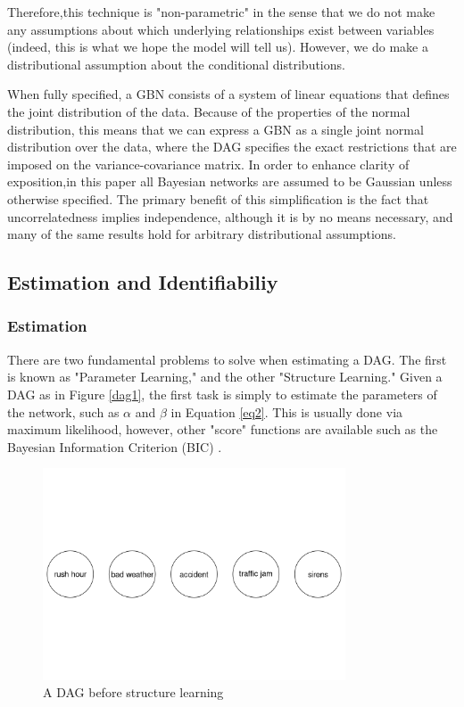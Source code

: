 \documentclass{article}
\begin{document}
Therefore,this technique is "non-parametric" in the sense that we do not make any assumptions about which underlying relationships exist between variables (indeed, this is what we hope the model will tell us). However, we do make a distributional assumption about the conditional distributions.

When fully specified, a GBN consists of a system of linear equations that defines the joint distribution of the data. Because of the properties of the normal distribution, this means that we can express a GBN as a single joint normal distribution over the data, where the DAG specifies the exact restrictions that are imposed on the variance-covariance matrix. In order to enhance clarity of exposition,in this paper all Bayesian networks are assumed to be Gaussian unless otherwise specified. The primary benefit of this simplification is the fact that uncorrelatedness implies independence, although it is by no means necessary, and many of the same results hold for arbitrary distributional assumptions.

\subsection{Estimation and Identifiabiliy}

\subsubsection{Estimation}

There are two fundamental problems to solve when estimating a DAG. The first is known as "Parameter Learning," and the other "Structure Learning." Given a DAG as in Figure \ref{dag1}, the first task is simply to estimate the parameters of the network, such as $\alpha$ and $\beta$ in Equation \ref{eq2}. This is usually done via maximum likelihood, however, other "score" functions are available such as the Bayesian Information Criterion (BIC) \parencite{chen1998speaker}.

\begin{figure}
  \centering
  \includegraphics[width=0.8\textwidth]{images/trafficjam_unfit.png}
  \caption{A DAG before structure learning}
  \label{dag2}
\end{figure}
\end{document}
